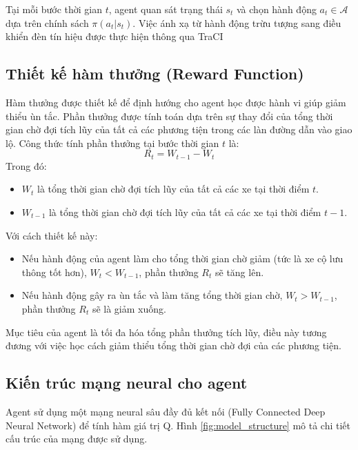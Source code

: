 Tại mỗi bước thời gian $t$, agent quan sát trạng thái $s_t$ và chọn hành động $a_t \in \mathcal{A}$ dựa trên chính sách $\pi(a_t|s_t)$. Việc ánh xạ từ hành động trừu tượng sang điều khiển đèn tín hiệu được thực hiện thông qua TraCI



\subsection{Thiết kế hàm thưởng (Reward Function)}
Hàm thưởng được thiết kế để định hướng cho agent học được hành vi giúp giảm thiểu ùn tắc. Phần thưởng được tính toán dựa trên sự thay đổi của tổng thời gian chờ đợi tích lũy của tất cả các phương tiện trong các làn đường dẫn vào giao lộ. Công thức tính phần thưởng tại bước thời gian $t$ là:
\[
    R_{t} = W_{t-1}- W_{t}
\]
Trong đó:
\begin{itemize}
    \item $W_{t}$ là tổng thời gian chờ đợi tích lũy của tất cả các xe tại thời điểm
        $t$.

    \item $W_{t-1}$ là tổng thời gian chờ đợi tích lũy của tất cả các xe tại thời
        điểm $t-1$.
\end{itemize}
Với cách thiết kế này:
\begin{itemize}
    \item Nếu hành động của agent làm cho tổng thời gian chờ giảm (tức là xe cộ
        lưu thông tốt hơn), $W_{t} < W_{t-1}$, phần thưởng $R_{t}$ sẽ tăng lên.

    \item Nếu hành động gây ra ùn tắc và làm tăng tổng thời gian chờ,
        $W_{t} > W_{t-1}$, phần thưởng $R_{t}$ sẽ là giảm xuống.
\end{itemize}
Mục tiêu của agent là tối đa hóa tổng phần thưởng tích lũy, điều này tương đương với việc học cách giảm thiểu tổng thời gian chờ đợi của các phương tiện.

\subsection{Kiến trúc mạng neural cho agent}
Agent sử dụng một mạng neural sâu đầy đủ kết nối (Fully Connected Deep Neural Network) để tính hàm giá trị Q. Hình \ref{fig:model_structure} mô tả chi tiết cấu trúc của mạng được sử dụng.

